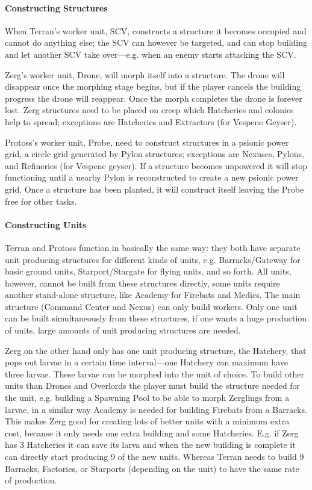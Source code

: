 \paragraph{Constructing Structures} When Terran's worker unit, SCV, constructs a structure it
becomes occupied and cannot do anything else; the SCV can however be targeted, and can stop building
and let another SCV take over—e.g. when an enemy starts attacking the SCV.

Zerg’s worker unit, Drone, will morph itself into a structure. The drone will disappear once the
morphing stage begins, but if the player cancels the building progress the drone will reappear. Once
the morph completes the drone is forever lost. Zerg structures need to be placed on creep which
Hatcheries and colonies help to spread; exceptions are Hatcheries and Extractors (for Vespene
Geyser).

Protoss’s worker unit, Probe, need to construct structures in a psionic power grid, a circle grid
generated by Pylon structures; exceptions are Nexuses, Pylons, and Refineries (for Vespene geyser).
If a structure becomes unpowered it will stop functioning until a nearby Pylon is reconstructed to
create a new psionic power grid. Once a structure has been planted, it will construct itself leaving
the Probe free for other tasks.

\paragraph{Constructing Units}
Terran and Protoss function in basically the same way: they both have separate unit producing
structures for different kinds of units, e.g. Barracks/Gateway for basic ground units,
Starport/Stargate for flying units, and so forth. All units, however, cannot be built from these
structures directly, some units require another stand-alone structure, like Academy for Firebats and
Medics. The main structure (Command Center and Nexus) can only build workers. Only one unit can be
built simultaneously from these structures, if one wants a huge production of units, large amounts
of unit producing structures are needed.

Zerg on the other hand only has one unit producing structure, the Hatchery, that pops out larvae in
a certain time interval—one Hatchery can maximum have three larvae. These larvae can be morphed into
the unit of choice. To build other units than Drones and Overlords the player must build the
structure needed for the unit, e.g. building a Spawning Pool to be able to morph Zerglings from a
larvae, in a similar way Academy is needed for building Firebats from a Barracks. This makes Zerg
good for creating lots of better units with a minimum extra cost, because it only needs one extra
building and some Hatcheries. E.g. if Zerg has 3 Hatcheries it can save its larva and when the new
building is complete it can directly start producing 9 of the new units. Whereas Terran needs to
build 9 Barracks, Factories, or Starports (depending on the unit) to have the same rate of
production.

